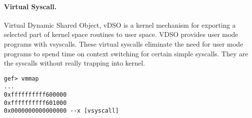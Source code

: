 \paragraph{Virtual Syscall.} Virtual Dynamic Shared Object, vDSO is a kernel mechanism for exporting a selected part of kernel space routines to user space. VDSO provides user mode programs with vsyscalls. These virtual syscalls eliminate the need for user mode programs to spend time on context switching for certain simple syscalls. They are the syscalls without really trapping into kernel.

\begin{lstlisting}[caption=vDSO mapping]
gef> vmmap
...
0xffffffffff600000 
0xffffffffff601000 
0x0000000000000000 --x [vsyscall]
\end{lstlisting}
